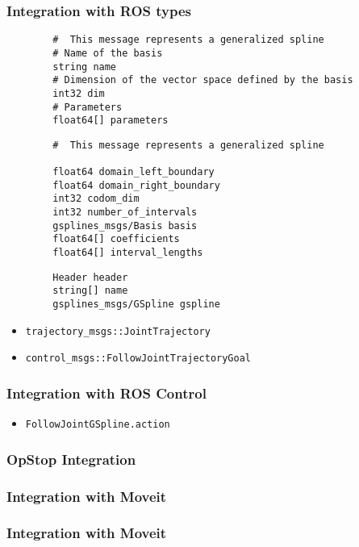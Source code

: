 \begin{frame}[fragile]
	\frametitle{Integration with ROS types}
	\begin{lstlisting}
        #  This message represents a generalized spline
        # Name of the basis
        string name
        # Dimension of the vector space defined by the basis
        int32 dim
        # Parameters
        float64[] parameters
	\end{lstlisting}
	\begin{lstlisting}
        #  This message represents a generalized spline

        float64 domain_left_boundary
        float64 domain_right_boundary
        int32 codom_dim
        int32 number_of_intervals
        gsplines_msgs/Basis basis
        float64[] coefficients
        float64[] interval_lengths
	\end{lstlisting}
	\begin{lstlisting}
        Header header
        string[] name
        gsplines_msgs/GSpline gspline
	\end{lstlisting}
	\begin{itemize}
		\item \Verb|trajectory_msgs::JointTrajectory|
		\item \Verb|control_msgs::FollowJointTrajectoryGoal|

	\end{itemize}
\end{frame}

\begin{frame}[fragile]
	\frametitle{Integration with ROS Control}
	\begin{itemize}
		\item \Verb|FollowJointGSpline.action|
	\end{itemize}


\end{frame}

\begin{frame}[t]
	\frametitle{OpStop Integration}

\end{frame}

\begin{frame}[t]
	\frametitle{Integration with Moveit}

\end{frame}

\begin{frame}[t]
	\frametitle{Integration with Moveit}

\end{frame}

